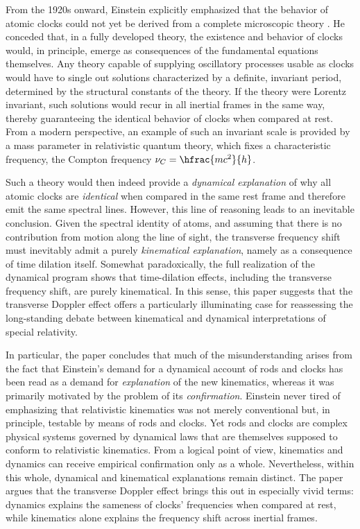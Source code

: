 \documentclass[pdflatex]{sn-jnl} %
\newcommand{\tDe}{transverse Doppler effect\xspace}
\providecommand{\DIFadd}[1]{{\protect\color{blue}\uwave{#1}}} %
\providecommand{\DIFaddbegin}{} %
\providecommand{\DIFaddend}{} %
\begin{document}
From the 1920s onward, Einstein explicitly emphasized that the behavior of atomic clocks could not yet be derived from a complete microscopic theory \citep{Einstein1921,Einstein1923,Einstein1924,Einstein1926,Einstein1949}. He conceded that, in a fully developed theory, the existence and behavior of clocks would, in principle, emerge as consequences of the fundamental equations themselves. Any theory capable of supplying oscillatory processes usable as clocks would have to single out solutions characterized by a definite, invariant period, determined by the structural constants of the theory. If the theory were Lorentz invariant, such solutions would recur in all inertial frames in the same way, thereby guaranteeing the identical behavior of clocks when compared at rest. From a modern perspective, an example of such an invariant scale is provided by a mass parameter in relativistic quantum theory, which fixes a characteristic frequency, the Compton frequency $\nu_C=\hfrac{mc^2}{h}$.  

Such a theory would then indeed provide a \emph{dynamical explanation} of why all atomic clocks are \emph{identical} when compared in the same rest frame and therefore emit the same spectral lines. However, this line of reasoning leads to an inevitable conclusion. Given the spectral identity of atoms, and assuming that there is no contribution from motion along the line of sight, the transverse frequency shift must inevitably admit a purely \emph{kinematical explanation}, namely as a consequence of time dilation itself. Somewhat paradoxically, the full realization of the dynamical program shows that time-dilation effects, including the transverse frequency shift, are purely kinematical. In this sense, this paper suggests that the \tDe offers a particularly illuminating case for reassessing the long-standing debate between kinematical and dynamical interpretations of special relativity. 

In particular, the paper concludes that much of the misunderstanding arises from the fact that Einstein’s demand for a dynamical account of rods and clocks has been read as a demand for \DIFaddbegin \DIFadd{an }\DIFaddend \emph{explanation} of the new kinematics, whereas it was primarily motivated by the problem of its \emph{confirmation}. Einstein never tired of emphasizing that relativistic kinematics was not merely conventional but, in principle, testable by means of rods and clocks. Yet rods and clocks are complex physical systems governed by dynamical laws that are themselves supposed to conform to relativistic kinematics. From a logical point of view, kinematics and dynamics can receive empirical confirmation only as a whole. Nevertheless, within this whole, dynamical and kinematical explanations remain distinct. The paper argues that the \tDe brings this out in especially vivid terms: dynamics explains the sameness of clocks’ frequencies when compared at rest, while kinematics alone explains the frequency shift across inertial frames.
\end{document}
